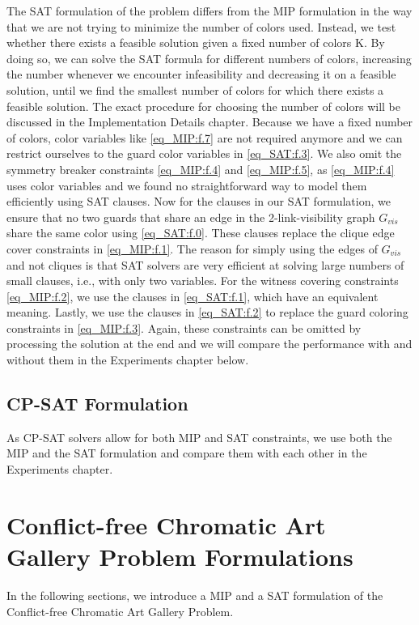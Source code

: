 The SAT formulation of the problem differs from the MIP formulation in the way that we are not trying to minimize the number of colors used. Instead, we test whether there exists a feasible solution given a fixed number of colors K. By doing so, we can solve the SAT formula for different numbers of colors, increasing the number whenever we encounter infeasibility and decreasing it on a feasible solution, until we find the smallest number of colors for which there exists a feasible solution. The exact procedure for choosing the number of colors will be discussed in the Implementation Details chapter. Because we have a fixed number of colors, color variables like \cref{eq_MIP:f.7} are not required anymore and we can restrict ourselves to the guard color variables in \cref{eq_SAT:f.3}. We also omit the symmetry breaker constraints \cref{eq_MIP:f.4} and \cref{eq_MIP:f.5}, as \cref{eq_MIP:f.4} uses color variables and we found no straightforward way to model them efficiently using SAT clauses. Now for the clauses in our SAT formulation, we ensure that no two guards that share an edge in the 2-link-visibility graph $G_{vis}$ share the same color using \cref{eq_SAT:f.0}. These clauses replace the clique edge cover constraints in \cref{eq_MIP:f.1}. The reason for simply using the edges of $G_{vis}$ and not cliques is that SAT solvers are very efficient at solving large numbers of small clauses, i.e., with only two variables. For the witness covering constraints \cref{eq_MIP:f.2}, we use the clauses in \cref{eq_SAT:f.1}, which have an equivalent meaning. Lastly, we use the clauses in \cref{eq_SAT:f.2} to replace the guard coloring constraints in \cref{eq_MIP:f.3}. Again, these constraints can be omitted by processing the solution at the end and we will compare the performance with and without them in the Experiments chapter below.

\section{CP-SAT Formulation}

As CP-SAT solvers allow for both MIP and SAT constraints, we use both the MIP and the SAT formulation and compare them with each other in the Experiments chapter.

\chapter{Conflict-free Chromatic Art Gallery Problem Formulations}

In the following sections, we introduce a MIP and a SAT formulation of the Conflict-free Chromatic Art Gallery Problem.

